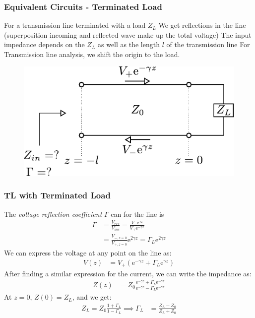\documentclass[10pt, compress]{beamer}
\newcommand{\e}{\mathrm{e}} %
\begin{document}
\begin{frame}
  \frametitle{Equivalent Circuits - Terminated Load}
\begin{outline}
  \1 For a transmission line terminated with a load $Z_L$
  \2 We get reflections in the line (superposition incoming and reflected wave make up the total voltage)
  \1 The input impedance depends on the $Z_L$ as well as the length $l$ of the transmission line
  \1 For Transmission line analysis, we shift the origin to the load.
\end{outline}

  \begin{figure}[H!]
    \centering
    \includegraphics[width=.8\textwidth]{tline_terminated.pdf}
  \end{figure}

\end{frame}

\begin{frame}
  \frametitle{TL with Terminated Load}
  The \textit{voltage reflection coefficient} $\Gamma$ can for the line is
  \begin{align*}
    \Gamma &= \frac{V_{ref}}{V_{inc}} = \frac{V_{-} \e^{\gamma z}}{V_{+} \e^{-\gamma z}} \\
    &= \frac{V_{-,z = 0}}{V_{+,z = 0}} \e^{2 \gamma z} = \Gamma_L \e^{2 \gamma z}
  \end{align*}
  We can express the voltage at any point on the line as:
\begin{align*}
  V(z) &= V_{+} \left( \e^{- \gamma z} + \Gamma_L \e^{ \gamma z} \right)
\end{align*}
After finding a similar expression for the current, we can write the impedance as:
\begin{align*}
  Z(z) &= Z_0 \frac{\e^{-\gamma z} + \Gamma_L \e^{-\gamma z}}{\e^{-\gamma z} - \Gamma_L \e^{-\gamma z}}
\end{align*}
At $z = 0$, $Z(0) = Z_L$, and we get:
\begin{align*}
  Z_L = Z_0 \frac{1 + \Gamma_L}{1 - \Gamma_L} \implies \Gamma_L &= \frac{Z_L - Z_0}{Z_L + Z_0}
\end{align*}
\end{frame}
\end{document}
